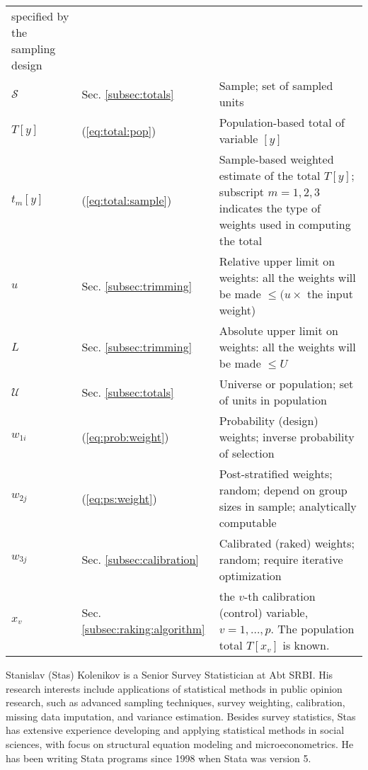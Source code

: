\begin{tabular}{llp{9.5cm}}
            specified by the sampling design \\
%
    $\mathcal{S}$ & Sec. \ref{subsec:totals} & Sample; set of sampled units \\
    $T[y]$ & (\ref{eq:total:pop}) & Population-based total of variable $[y]$ \\
    $t_m[y]$ & (\ref{eq:total:sample}) & Sample-based weighted estimate of the total
        $T[y]$; subscript $m=1,2,3$ indicates the type of weights used in computing
        the total \\
    $u$ & Sec. \ref{subsec:trimming} & Relative upper limit on weights: all the weights will be made
        $\le (u \times$ the input weight) \\
    $L$ & Sec. \ref{subsec:trimming} & Absolute upper limit on weights: all the weights will be made
        $\le U$ \\
    $\mathcal{U}$ & Sec. \ref{subsec:totals} & Universe or population; set of units in population \\
%
    $w_{1i}$ & (\ref{eq:prob:weight}) & Probability (design) weights;
        inverse probability of selection \\
    $w_{2j}$ & (\ref{eq:ps:weight}) & Post-stratified weights;
        random; depend on group sizes in sample; analytically computable \\
    $w_{3j}$ & Sec. \ref{subsec:calibration} & Calibrated (raked) weights; random;
        require iterative optimization \\
%
    $x_v$ & Sec. \ref{subsec:raking:algorithm} & the $v$-th calibration (control)
        variable, $v=1,\ldots,p$. The population total $T[x_v]$ is known. \\
\end{tabular}

\begin{aboutauthor}
  Stanislav (Stas) Kolenikov is a Senior Survey Statistician at Abt SRBI.
  His research interests include
  applications of statistical methods in public opinion research,
  such as advanced sampling techniques, survey weighting,
  calibration, missing data imputation, and variance estimation.
  Besides survey statistics, Stas has extensive experience developing and applying
  statistical methods in social sciences, with focus on structural equation
  modeling and microeconometrics. He has been writing Stata programs since
  1998 when Stata was version 5.
\end{aboutauthor}
